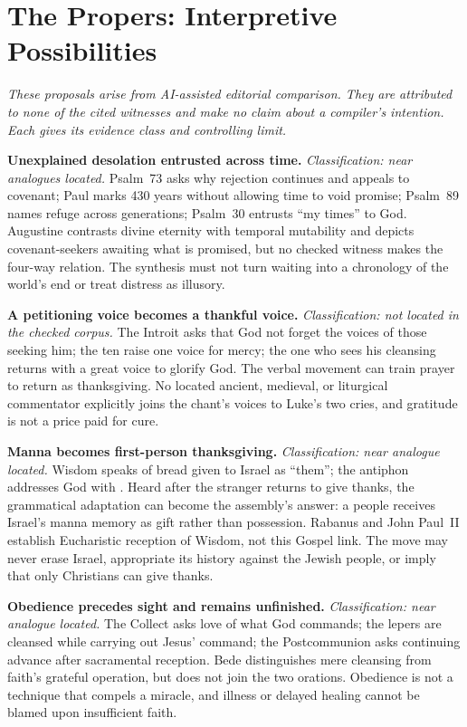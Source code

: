 \sectionguard
\section*{The Propers: Interpretive Possibilities}

\noindent\emph{These proposals arise from AI-assisted editorial comparison.
They are attributed to none of the cited witnesses and make no claim about a
compiler's intention. Each gives its evidence class and controlling limit.}

\noindent\textbf{Unexplained desolation entrusted across time.\enspace{}}
\emph{Classification: near analogues located.} Psalm~73 asks why rejection
continues and appeals to covenant; Paul marks 430 years without allowing time
to void promise; Psalm~89 names refuge across generations; Psalm~30 entrusts
``my times'' to God. Augustine contrasts divine eternity with temporal
mutability and depicts covenant-seekers awaiting what is promised, but no
checked witness makes the four-way relation. The synthesis must not turn
waiting into a chronology of the world's end or treat distress as illusory.

\noindent\textbf{A petitioning voice becomes a thankful voice.\enspace{}}
\emph{Classification: not located in the checked corpus.} The Introit asks
that God not forget the voices of those seeking him; the ten raise one voice
for mercy; the one who sees his cleansing returns with a great voice to
glorify God. The verbal movement can train prayer to return as thanksgiving.
No located ancient, medieval, or liturgical commentator explicitly joins the
chant's voices to Luke's two cries, and gratitude is not a price paid for cure.

\noindent\textbf{Manna becomes first-person thanksgiving.\enspace{}}
\emph{Classification: near analogue located.} Wisdom speaks of bread given
to Israel as ``them''; the antiphon addresses God with . Heard after the stranger returns to give thanks, the grammatical
adaptation can become the assembly's answer: a people receives Israel's manna
memory as gift rather than possession. Rabanus and John Paul~II establish
Eucharistic reception of Wisdom, not this Gospel link. The move may never
erase Israel, appropriate its history against the Jewish people, or imply
that only Christians can give thanks.

\noindent\textbf{Obedience precedes sight and remains unfinished.\enspace{}}
\emph{Classification: near analogue located.} The Collect asks love of what
God commands; the lepers are cleansed while carrying out Jesus' command; the
Postcommunion asks continuing advance after sacramental reception. Bede
distinguishes mere cleansing from faith's grateful operation, but does not
join the two orations. Obedience is not a technique that compels a miracle,
and illness or delayed healing cannot be blamed upon insufficient faith.

